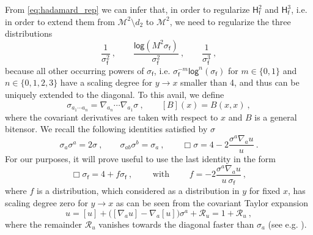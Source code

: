 \documentclass[11pt]{book}
\renewcommand{\log}{\mathsf{log}}
\newcommand{\Mcal}{\mathcal{M}}
\newcommand{\Rcal}{\mathcal{R}}
\newcommand{\Hsf}{\mathsf{H}}
\newcommand{\fsf}{\mathsf{f}}
\theoremstyle{break}
\begin{document}
From \eqref{eq:hadamard_rep} we can infer that, in order to regularize $\Hsf^2_\fsf$ and $\Hsf^3_\fsf$, i.e. in order to extend them from $\Mcal^2 \setminus d_2$ to $\Mcal^2$, we need to regularize the three distributions
%
\begin{equation}
\frac{1}{\sigma_\fsf^2} \ , \qquad \frac{\log \left(M^2 \sigma_\fsf\right)}{\sigma_\fsf^2} \ , \qquad \frac{1}{\sigma_\fsf^3} \ ,
\label{eq:sigma_problematic}
\end{equation}
%
because all other occurring powers of $\sigma_\fsf$, i.e. $\sigma^{-m}_\fsf\log^n(\sigma_\fsf)$ for $m\in\{0,1\}$ and $n\in\{0,1,2,3\}$ have a scaling degree for $y\to x$ smaller than 4, and thus can be uniquely extended to the diagonal. To this avail, we define 
%
\begin{equation*}
\sigma_{a_1\cdots a_n} = \nabla_{a_n} \cdots \nabla_{a_1} \sigma \ , \qquad [B](x) = B(x,x) \ , 
\end{equation*}
%
where the covariant derivatives are taken with respect to $x$ and $B$ is a general bitensor. We recall the following identities satisfied by $\sigma$
%
\begin{equation}
\sigma_a \sigma^a = 2 \sigma \ , \qquad 
\sigma_{ab} \sigma^b = \sigma_a \ , \qquad 
\Box \sigma = 4 - 2 \frac{\sigma^a \nabla_a u}{u} \ .
\label{eq:sigma_identities}
\end{equation}
%
For our purposes, it will prove useful to use the last identity in the form
%
\begin{equation*}
\Box \sigma_\fsf = 4 + f \sigma_\fsf \ , \qquad
\mbox{ with } \qquad f = - 2 \frac{\sigma^a \nabla_a u}{u \ \sigma_\fsf} \ ,
\label{eq:def_f_sigma}
\end{equation*}
%
where $f$ is a distribution, which considered as a distribution in $y$ for fixed $x$, has scaling degree zero for $y \to x$ as can be seen from the covariant Taylor expansion
%
\begin{equation*}
u = [u] + \bigg( [\nabla_a u] - \nabla_a [u] \bigg) \sigma^a + \Rcal_u = 1 + \Rcal_u \ , 
\end{equation*}
%
where the remainder $\Rcal_u$ vanishes towards the diagonal faster than $\sigma_a$  (see e.g. \cite{poisson_motion_2011}).


\end{document}
